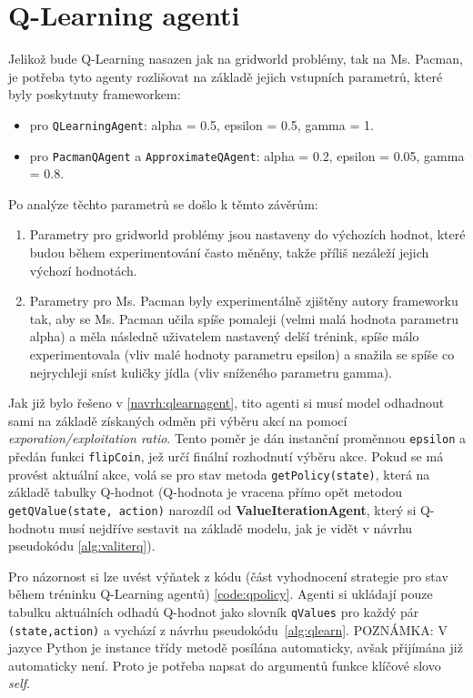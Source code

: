 \section{Q-Learning agenti}
Jelikož bude Q-Learning nasazen jak na gridworld problémy, tak na Ms. Pacman, je potřeba tyto agenty rozlišovat na základě jejich vstupních parametrů, které byly poskytnuty frameworkem:
\begin{itemize}
\item pro \texttt{QLearningAgent}: alpha = 0.5, epsilon = 0.5, gamma = 1.
\item pro \texttt{PacmanQAgent} a \texttt{ApproximateQAgent}: alpha = 0.2, epsilon = 0.05, gamma = 0.8.
\end{itemize}
Po analýze těchto parametrů se došlo k těmto závěrům:
\begin{enumerate}
\item Parametry pro gridworld problémy jsou nastaveny do výchozích hodnot, které budou během experimentování často měněny, takže příliš nezáleží jejich výchozí hodnotách.
\item Parametry pro Ms. Pacman byly experimentálně zjištěny autory frameworku tak, aby se Ms. Pacman učila spíše pomaleji (velmi malá hodnota parametru alpha) a měla následně uživatelem nastavený delší trénink, spíše málo experimentovala (vliv malé hodnoty parametru epsilon) a snažila se spíše co nejrychleji sníst kuličky jídla (vliv sníženého parametru gamma).
\end{enumerate}
Jak již bylo řešeno v \ref{navrh:qlearnagent}, tito agenti si musí model odhadnout sami na základě získaných odměn při výběru akcí na pomocí \textit{exporation/exploitation ratio}. Tento poměr je dán instanční proměnnou \texttt{epsilon} a předán funkci \texttt{flipCoin}, jež určí finální rozhodnutí výběru akce. Pokud se má provést aktuální akce, volá se pro stav metoda \texttt{getPolicy(state)}, která na základě tabulky Q-hodnot (Q-hodnota je vracena přímo opět metodou \texttt{getQValue(state, action)} narozdíl od \textbf{ValueIterationAgent}, který si Q-hodnotu musí nejdříve sestavit na základě modelu, jak je vidět v návrhu pseudokódu \ref{alg:valiterq}).

Pro názornost si lze uvést výňatek z kódu (část vyhodnocení strategie pro stav během tréninku Q-Learning agentů) \ref{code:qpolicy}. Agenti si ukládají pouze tabulku aktuálních odhadů Q-hodnot jako slovník \texttt{qValues} pro každý pár \texttt{(state,action)} a vychází z návrhu pseudokódu~\ref{alg:qlearn}.
\newline POZNÁMKA: V jazyce Python je instance třídy metodě posílána automaticky, avšak přijímána již automaticky není. Proto je potřeba napsat do argumentů funkce klíčové slovo \textit{self}.

